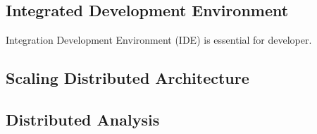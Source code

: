 \subsection{Integrated Development Environment}

Integration Development Environment (IDE) is essential for developer. 


\subsection{Scaling Distributed Architecture}

\subsection{Distributed Analysis}

